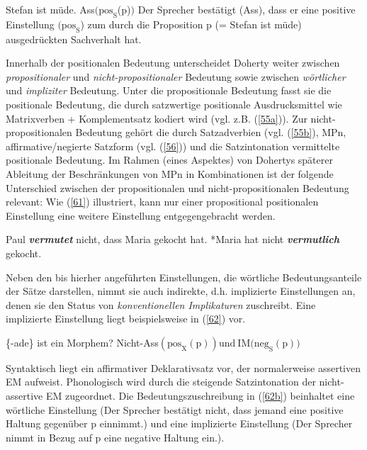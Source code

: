 \begin{exe}
	\ex\label{60} 
		\begin{xlist}	
			\ex\label{60a} Stefan ist müde.
			\ex\label{60b} Ass$(\textrm{pos}_{\textrm{S}}$(\textrm{p})$)$	
			\ex\label{60c} Der Sprecher bestätigt (Ass), dass er eine positive Einstellung $(\textrm{pos}_{\textrm{S}}$) zum durch die Proposition 				p (= Stefan ist müde) ausgedrückten Sachverhalt hat.
		\end{xlist}
\end{exe}
Innerhalb der positionalen Bedeutung unterscheidet Doherty weiter zwischen \textit{propositionaler}  und \textit{nicht-propositionaler} Bedeutung  sowie zwischen \textit{wörtlicher}  und  \textit{impliziter} Bedeutung. Unter die propositionale Bedeutung fasst sie die positionale Bedeutung, die durch satzwertige positionale Ausdrucksmittel wie Matrixverben + Komplementsatz kodiert wird (vgl. z.B. (\ref{55a})). Zur nicht-propositio\-nalen Bedeutung gehört die durch Satzadverbien (vgl. (\ref{55b}), MPn, affirmative/ne\-gierte Satzform (vgl. (\ref{56})) und die Satzintonation vermittelte positionale Bedeutung. Im Rahmen (eines Aspektes) von Dohertys späterer Ableitung der Beschrän\-kungen von MPn in Kombinationen ist der folgende Unterschied zwischen der propositionalen und nicht-propositionalen Bedeutung relevant: Wie (\ref{61}) illustriert, kann nur einer propositional positionalen Einstellung eine weitere Einstellung entgegengebracht werden.
\begin{exe}
	\ex\label{61} 
		\begin{xlist}	
			\ex\label{61a} Paul \textbf{\textit{vermutet}} nicht, dass Maria gekocht hat. 
			\ex\label{61b} *Maria hat nicht \textbf{\textit{vermutlich}} gekocht.	
		\end{xlist}
\end{exe}
Neben den bis hierher angeführten Einstellungen, die wörtliche Bedeutungsanteile der Sätze darstellen, nimmt sie auch indirekte, d.h. implizierte Einstellungen an, denen sie den Status von \textit{konventionellen Implikaturen}  zuschreibt. Eine implizierte Einstellung liegt beispielsweise in (\ref{62}) vor.

\begin{exe}
	\ex\label{62} 
		\begin{xlist}	
			\ex\label{62a} \{-ade\} ist ein Morphem?
			\ex\label{62b} Nicht-Ass$(\textrm{pos}_{\textrm{X}}(\textrm{p})) \textrm{und} \ \textrm{IM(neg}_{\textrm{S}}(\textrm{p}))$
		\end{xlist}
\end{exe}
Syntaktisch liegt ein affirmativer Deklarativsatz vor, der normalerweise asserti\-ven EM aufweist. Phonologisch wird durch die steigende Satzintonation der nicht-assertive EM zugeordnet. Die Bedeutungszuschreibung in (\ref{62b}) beinhaltet eine wört\-liche Einstellung (Der Sprecher bestätigt nicht, dass jemand eine positive Haltung gegenüber p einnimmt.) und eine implizierte Einstellung (Der Sprecher nimmt in Bezug auf p eine negative Haltung ein.). 

